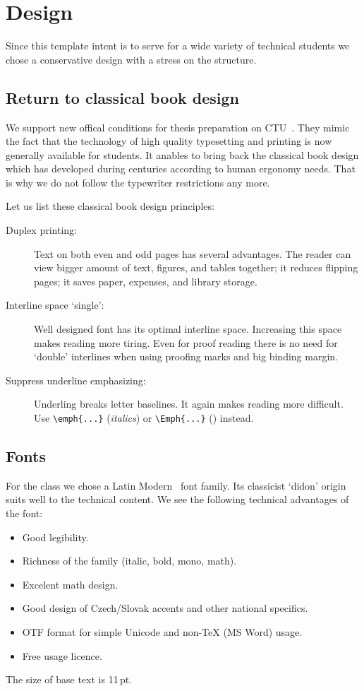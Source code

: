 %

\chapter{Design}
Since this template intent is to serve for a wide variety of
technical students we chose a conservative design with a stress on
the structure.

\section{Return to classical book design}
We support new offical conditions for thesis preparation on
CTU~\cite{CVUT_FEL:zaverecne_prace}. They mimic the fact that the
technology of high quality typesetting and printing is now generally 
available for students. It anables to bring back the classical book
design which has developed during centuries according to human ergonomy
needs. That is why we do not follow the typewriter restrictions
any more.

Let us list these classical book design principles:
\begin{description}
\item[Duplex printing:] Text on both even and odd pages has several
  advantages. The reader can view bigger amount of text, figures, and
  tables together; it reduces flipping pages; it saves paper, expenses, and
  library storage.
\item[Interline space `single':] Well designed font has its optimal
  interline space. Increasing this space makes reading more
  tiring. Even for proof reading there is no need for
  `double' interlines when using proofing marks and big
  binding margin.
\item[Suppress underline emphasizing:] Underling breaks letter
  baselines. It again makes reading more difficult. Use
  \verb+\emph{...}+ (\emph{italics}) or \verb+\Emph{...}+ () instead.
\end{description}

\section{Fonts}
For the class we chose a Latin Modern~\cite{LatinModern} font family. Its
classicist `didon' origin suits well to the technical content.
We see the following technical advantages of the font:
\begin{itemize}
\item Good legibility.
\item Richness of the family (italic, bold, mono, math).
\item Excelent math design.
\item Good design of Czech/Slovak accents and other national specifics.
\item OTF format for simple Unicode and non-\TeX{} (MS Word) usage.
\item Free usage licence.
\end{itemize}
The size of base text is 11\,pt.

